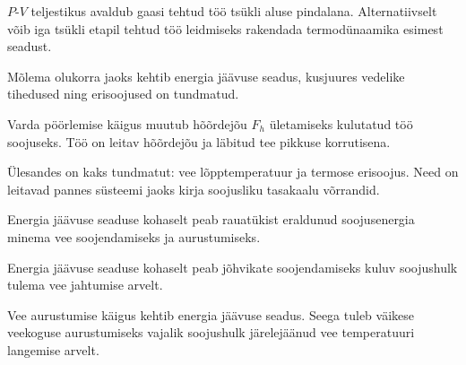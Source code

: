\documentclass[10pt, twoside]{article}
\begin{document}
{
\hint
$P$-$V$ teljestikus avaldub gaasi tehtud töö tsükli aluse pindalana. Alternatiivselt võib iga tsükli etapil tehtud töö leidmiseks rakendada termodünaamika esimest seadust.
\probend
\bigskip


\hint
Mõlema olukorra jaoks kehtib energia jäävuse seadus, kusjuures vedelike tihedused ning erisoojused on tundmatud.
\probend
\bigskip


\hint
Varda pöörlemise käigus muutub hõõrdejõu $F_h$ ületamiseks kulutatud töö soojuseks. Töö on leitav hõõrdejõu ja läbitud tee pikkuse korrutisena.
\probend
\bigskip


\hint
Ülesandes on kaks tundmatut: vee lõpptemperatuur ja termose erisoojus. Need on leitavad pannes süsteemi jaoks kirja soojusliku tasakaalu võrrandid.
\probend
\bigskip


\hint
Energia jäävuse seaduse kohaselt peab rauatükist eraldunud soojusenergia minema vee soojendamiseks ja aurustumiseks.
\probend
\bigskip


\hint
Energia jäävuse seaduse kohaselt peab jõhvikate soojendamiseks kuluv soojushulk tulema vee jahtumise arvelt.
\probend
\bigskip


\hint
Vee aurustumise käigus kehtib energia jäävuse seadus. Seega tuleb väikese veekoguse aurustumiseks vajalik soojushulk järelejäänud vee temperatuuri langemise arvelt.
\probend
\bigskip


}
\end{document}
